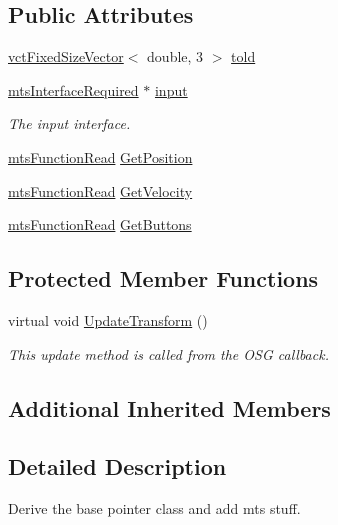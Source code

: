 \subsection*{Public Attributes}
\begin{DoxyCompactItemize}
\item 
\hyperlink{classvct_fixed_size_vector}{vct\+Fixed\+Size\+Vector}$<$ double, 3 $>$ \hyperlink{classmts_o_s_g_pointer3_d_1_1_pointer_ac94be80751edb5e58d4ee60957cdd3a3}{told}
\item 
\hyperlink{classmts_interface_required}{mts\+Interface\+Required} $\ast$ \hyperlink{classmts_o_s_g_pointer3_d_1_1_pointer_af85d097dea05276c496eccf2025e575b}{input}
\begin{DoxyCompactList}\small\item\em The input interface. \end{DoxyCompactList}\item 
\hyperlink{classmts_function_read}{mts\+Function\+Read} \hyperlink{classmts_o_s_g_pointer3_d_1_1_pointer_a151204448d9d738cf5dd0466fc04a4b1}{Get\+Position}
\item 
\hyperlink{classmts_function_read}{mts\+Function\+Read} \hyperlink{classmts_o_s_g_pointer3_d_1_1_pointer_a52093ee9261f7388b3e24a4201807819}{Get\+Velocity}
\item 
\hyperlink{classmts_function_read}{mts\+Function\+Read} \hyperlink{classmts_o_s_g_pointer3_d_1_1_pointer_a4f1417a7da524102eadd512eccbcdfc7}{Get\+Buttons}
\end{DoxyCompactItemize}
\subsection*{Protected Member Functions}
\begin{DoxyCompactItemize}
\item 
virtual void \hyperlink{classmts_o_s_g_pointer3_d_1_1_pointer_a34f8387720e5a62ba7b08e1fa558852b}{Update\+Transform} ()
\begin{DoxyCompactList}\small\item\em This update method is called from the O\+S\+G callback. \end{DoxyCompactList}\end{DoxyCompactItemize}
\subsection*{Additional Inherited Members}


\subsection{Detailed Description}
Derive the base pointer class and add mts stuff. 

